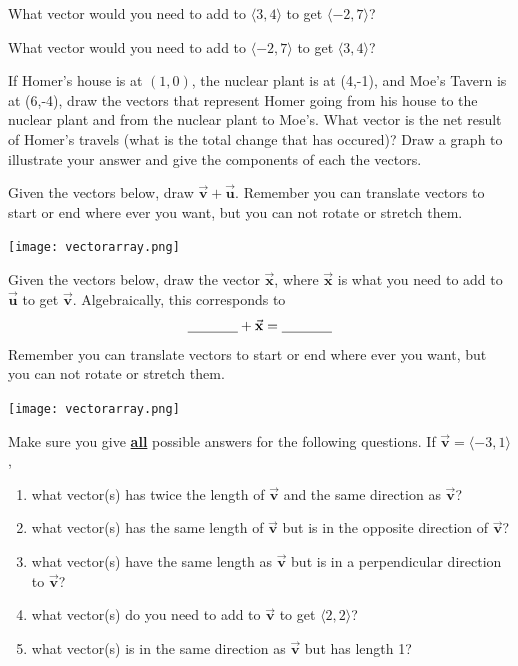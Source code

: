 \bq \be
\item What vector would you need to add to $\langle 3,4 \rangle$ to get \break $\langle -2,7 \rangle$?
\item What vector would you need to add to $\langle -2,7 \rangle$ to get $\langle 3,4 \rangle$?
\ee \eq

\bq If Homer's house is at $(1,0)$, the nuclear plant is at (4,-1), and Moe's Tavern is at (6,-4), draw the vectors that represent Homer going from his house to the nuclear plant and from the nuclear plant to Moe's. What vector is the net result of Homer's travels (what is the total change that has occured)? Draw a graph to illustrate your answer and give the components of each the vectors.
\eq

\bq Given the vectors below, draw $\vec{\textbf{v}}+\vec{\textbf{u}}$. Remember you can translate vectors to start or end where ever you want, but you can not rotate or stretch them.

\begin{center} \texttt{[image: vectorarray.png]} \end{center}
\eq

\bq Given the vectors below, draw the vector $\vec{\textbf{x}}$, where $\vec{\textbf{x}}$ is what you need to add to $\vec{\textbf{u}}$ to get $\vec{\textbf{v}}$. Algebraically, this corresponds to $$\underline{\hspace{.5in}} + \vec{\textbf{x}}= \underline{\hspace{.5in}}$$
Remember you can translate vectors to start or end where ever you want, but you can not rotate or stretch them.

\begin{center} \texttt{[image: vectorarray.png]} \end{center}
\eq

\bq Make sure you give \underline{\textbf{all}} possible answers for the following questions. If $\vec{\textbf{v}}= \langle -3,1\rangle $,\begin{enumerate}
\item what vector(s) has twice the length of $\vec{\textbf{v}}$ and the same direction as $\vec{\textbf{v}}$?
\item what vector(s) has the same length of $\vec{\textbf{v}}$ but is in the opposite direction of $\vec{\textbf{v}}$?
\item what vector(s) have the same length as $\vec{\textbf{v}}$ but is in a perpendicular direction to $\vec{\textbf{v}}$?
\item what vector(s) do you need to add to $\vec{\textbf{v}}$ to get $\langle 2,2 \rangle$?
\item what vector(s) is in the same direction as $\vec{\textbf{v}}$ but has length 1?
\end{enumerate}
\eq

